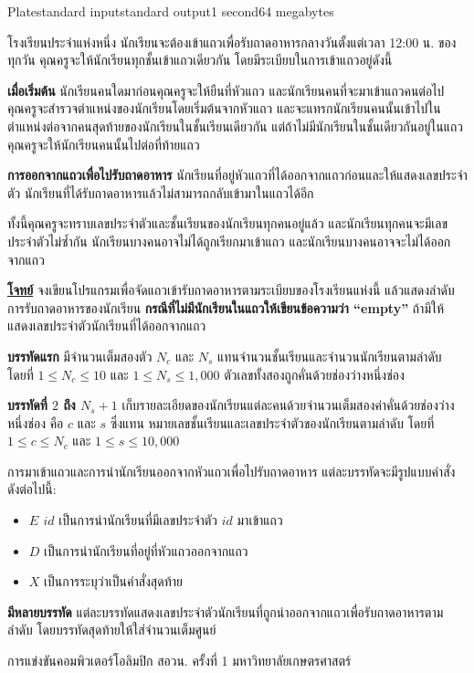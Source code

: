 \documentclass[11pt,a4paper]{article}
\begin{document}
\begin{problem}{Plate}{standard input}{standard output}{1 second}{64 megabytes}

โรงเรียนประจำแห่งหนึ่ง นักเรียนจะต้องเข้าแถวเพื่อรับถาดอาหารกลางวันตั้งแต่เวลา 12:00 น. ของทุกวัน คุณครูจะให้นักเรียนทุกชั้นเข้าแถวเดียวกัน โดยมีระเบียบในการเข้าแถวอยู่ดังนี้

\textbf{เมื่อเริ่มต้น} นักเรียนคนใดมาก่อนคุณครูจะให้ยืนที่หัวแถว และนักเรียนคนที่จะมาเข้าแถวคนต่อไปคุณครูจะสำรวจตำแหน่งของนักเรียนโดยเริ่มต้นจากหัวแถว และจะแทรกนักเรียนคนนั้นเข้าไปในตำแหน่งต่อจากคนสุดท้ายของนักเรียนในชั้นเรียนเดียวกัน แต่ถ้าไม่มีนักเรียนในชั้นเดียวกันอยู่ในแถวคุณครูจะให้นักเรียนคนนั้นไปต่อที่ท้ายแถว

\textbf{การออกจากแถวเพื่อไปรับถาดอาหาร} นักเรียนที่อยู่หัวแถวที่ได้ออกจากแถวก่อนและให้แสดงเลขประจำตัว นักเรียนที่ได้รับถาดอาหารแล้วไม่สามารถกลับเข้ามาในแถวได้อีก

ทั้งนี้คุณครูจะทราบเลขประจำตัวและชั้นเรียนของนักเรียนทุกคนอยู่แล้ว และนักเรียนทุกคนจะมีเลขประจำตัวไม่ซ้ำกัน นักเรียนบางคนอาจไม่ได้ถูกเรียกมาเข้าแถว และนักเรียนบางคนอาจจะไม่ได้ออกจากแถว


\underline{\textbf{โจทย์}} จงเขียนโปรแกรมเพื่อจัดแถวเข้ารับถาดอาหารตามระเบียบของโรงเรียนแห่งนี้ แล้วแสดงลำดับการรับถาดอาหารของนักเรียน \textbf{กรณีที่ไม่มีนักเรียนในแถวให้เขียนข้อความว่า “empty”} ถ้ามีให้แสดงเลขประจำตัวนักเรียนที่ได้ออกจากแถว


\InputFile
\textbf{บรรทัดแรก} มีจำนวนเต็มสองตัว $N_c$ และ $N_s$ แทนจำนวนชั้นเรียนและจำนวนนักเรียนตามลำดับ โดยที่ $1 \leq N_c \leq 10$ และ $1 \leq N_s \leq 1,000$ ตัวเลขทั้งสองถูกคั่นด้วยช่องว่างหนึ่งช่อง

\textbf{บรรทัดที่ $2$ ถึง $N_s + 1$} เก็บรายละเอียดของนักเรียนแต่ละคนด้วยจำนวนเต็มสองค่าคั่นด้วยช่องว่างหนึ่งช่อง คือ $c$ และ $s$ ซึ่งแทน หมายเลขชั้นเรียนและเลขประจำตัวของนักเรียนตามลำดับ โดยที่ $1 \leq c \leq N_c$ และ $1 \leq s \leq 10,000$

การมาเข้าแถวและการนำนักเรียนออกจากหัวแถวเพื่อไปรับถาดอาหาร แต่ละบรรทัดจะมีรูปแบบคำสั่ง ดังต่อไปนี้:
\begin{itemize}

\item \textbf{$E$ $id$} เป็นการนำนักเรียนที่มีเลขประจำตัว \textbf{$id$} มาเข้าแถว

\item \textbf{$D$} เป็นการนำนักเรียนที่อยู่ที่หัวแถวออกจากแถว

\item \textbf{$X$} เป็นการระบุว่าเป็นคำสั่งสุดท้าย
\end{itemize}
\OutputFile

\textbf{มีหลายบรรทัด} แต่ละบรรทัดแสดงเลขประจำตัวนักเรียนที่ถูกนำออกจากแถวเพื่อรับถาดอาหารตามลำดับ โดยบรรทัดสุดท้ายให้ใส่จำนวนเต็มศูนย์

\Examples

\begin{example}
%
\end{example}

\Source

การแข่งขันคอมพิวเตอร์โอลิมปิก สอวน. ครั้งที่ 1 มหาวิทยาลัยเกษตรศาสตร์

\end{problem}
\end{document}
